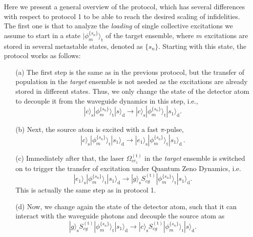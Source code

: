 \documentclass[twocolumn,pra,aps,superscriptaddress,showpacs]{revtex4-1}
\newcommand{\ket}[1]{|#1\rangle}
\newcommand{\trg}{\mathrm{(t)}}
\newcommand{\rs}{\mathrm{s}}
\newcommand{\rd}{\mathrm{d}}
\newcommand{\rt}{\mathrm{t}}
\begin{document}
Here we present a general overview of the protocol, which has several differences with respect to protocol 1 to be able to reach the desired scaling of infidelities. The first one is that to analyze the \emph{loading} of single collective excitations we assume to start in a state $\ket{\phi_m^{ \{ s_n\}}}_\rt$ of the target ensemble, where $m$ excitations are stored in several metastable states, denoted as $ \{ s_n\}$. Starting with this state, the protocol works as follows:
\begin{enumerate}
	\item [(a)]
	The first step is the same as in the previous protocol, but the transfer of population in the \emph{target} ensemble is not needed as the excitations are already stored in different states. Thus, we only change the state of the detector atom to decouple it from the waveguide dynamics in this step, i.e.,
	\begin{equation}
	\ket{c}_\rs  \ket{\phi_m^{ \{ s_n\}}}_\rt \ket{s}_\rd
	\rightarrow
	\ket{c}_\rs \ket{\phi_m^{ \{ s_n\}}}_\rt \ket{s_1}_\rd.
	\end{equation}
	\item [(b)]
	Next, the source atom is excited with a fast $\pi$-pulse,
	\begin{equation}
	\ket{c}_\rs \ket{\phi_m^{ \{ s_n\}}}_\rt \ket{s_1}_\rd
	\rightarrow 
	\ket{e_1}_\rs \ket{\phi_m^{ \{ s_n\}}}_\rt \ket{s_1}_\rd\,.
	\end{equation}
	
	\item [(c)] Immediately after that, the laser $\Omega_{ce_1}^\trg$ in the \emph{target} ensemble is switched on to trigger the transfer of excitation under Quantum Zeno Dynamics, i.e.
	\begin{equation}
	\ket{e_1}_\rs \ket{\phi_m^{ \{ s_n\}}}_\rt \ket{s_1}_\rd
	\rightarrow
	\ket{g}_\rs S_{cg}^{(\rt)}\ket{\phi_m^{ \{ s_n\}}}_\rt \ket{s_1}_\rd.
	\end{equation}
	This is actually the same step as in protocol 1.
	
	\item [(d)] Now, we change again the state of the detector atom, such that it can interact with the waveguide photons and decouple the source atom as
	\begin{equation}
	\ket{g}_\rs S_{cg}^{(\rt)}\ket{\phi_m^{ \{ s_n\}}}_\rt \ket{s_1}_\rd
	\rightarrow
	\ket{c}_\rs S_{cg}^{(\rt)}\ket{\phi_m^{ \{ s_n\}}}_\rt \ket{s}_\rd.
	\end{equation}
	

\end{enumerate}
\end{document}
